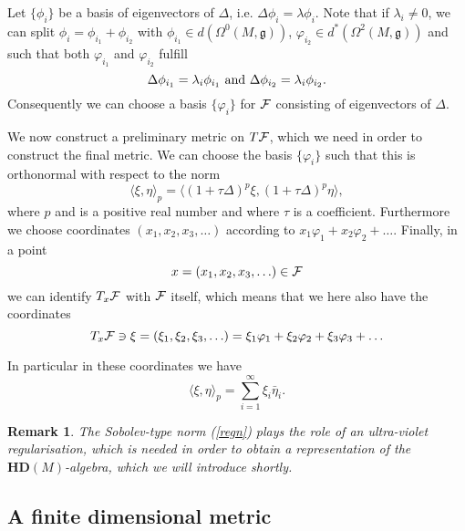 \documentclass[letterpaper,11pt]{article}
\def\cf{{\cal F}}
\newtheorem{remark}{Remark}
\newcommand{\cF}{{\cal F}}
\begin{document}
Let $\{ \phi_i\}$ be a basis of eigenvectors of $\Delta$, i.e. $\Delta \phi_i=\lambda \phi_i$. Note that if $\lambda_i\not= 0$, we can split $\phi_i=\phi_{i_1}+\phi_{i_2}$ with $\phi_{i_1}\in d(\Omega^0(M,\mathfrak{g}))$, $\varphi_{i_2}\in d^*(\Omega^2(M,\mathfrak{g}))$ and such that both $\varphi_{i_1}$ and $\varphi_{i_2}$ fulfill
\begin{equation*}
    \Delta \phi_{i_1}=\lambda_i \phi_{i_1} \hbox{ and }\Delta \phi_{i_2}=\lambda_i \phi_{i_2} . %
\end{equation*}
Consequently we can choose a basis $\{  \varphi_i \}$ for $\cf$ consisting of eigenvectors of $\Delta$. 





We now construct a preliminary metric on $T\cf$, which we need in order to construct the final metric. We can choose the basis $\{ \varphi_i\}$ such that this is orthonormal with respect to the norm 
\begin{equation}
\langle \xi , \eta \rangle_p=\langle (1+\tau\Delta)^p \xi, (1+\tau\Delta)^p \eta \rangle,  
\label{regn}
\end{equation}
where $p$ and is a positive real number and where $\tau$ is a coefficient. Furthermore we choose coordinates $(x_1,x_2,x_3,\ldots )$ according to $x_1\varphi_1+x_2\varphi_2+\ldots $. Finally, in a point 
$$x=(x_1,x_2,x_3,\ldots) \in \cF $$
we can identify $T_x\cF$ with $\cF$ itself, which means that we here also have the coordinates 
$$T_x\cf\ni \xi=(\xi_1,\xi_2,\xi_3,\ldots )=\xi_1\varphi_1+\xi_2\varphi_2+\xi_3\varphi_3+\ldots $$

In particular in these coordinates we have
$$\langle \xi , \eta    \rangle_p =\sum_{i=1}^\infty \xi_i\bar{\eta}_i .$$


\begin{remark}
The Sobolev-type norm (\ref{regn}) plays the role of an ultra-violet regularisation, which is needed in order to obtain a representation of the $\mathbf{HD}(M)$-algebra, which we will introduce shortly.
\end{remark}



\subsection{A finite dimensional metric}
\end{document}

